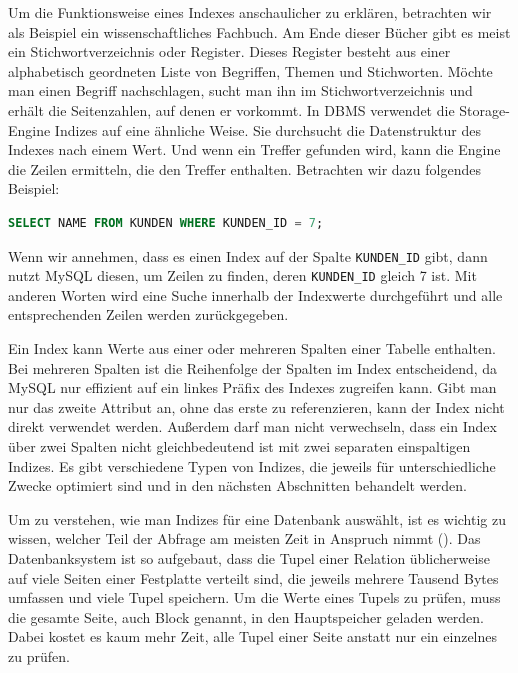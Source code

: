 Um die Funktionsweise eines Indexes anschaulicher zu erklären, betrachten wir als Beispiel ein wissenschaftliches Fachbuch.
Am Ende dieser Bücher gibt es meist ein Stichwortverzeichnis oder Register.
Dieses Register besteht aus einer alphabetisch geordneten Liste von Begriffen, Themen und Stichworten.
Möchte man einen Begriff nachschlagen, sucht man ihn im Stichwortverzeichnis und erhält die Seitenzahlen, auf denen er vorkommt.
In DBMS verwendet die Storage-Engine Indizes auf eine ähnliche Weise.
Sie durchsucht die Datenstruktur des Indexes nach einem Wert.
Und wenn ein Treffer gefunden wird, kann die Engine die Zeilen ermitteln, die den Treffer enthalten.
Betrachten wir dazu folgendes Beispiel:

\begin{lstlisting}[language=SQL]
SELECT NAME FROM KUNDEN WHERE KUNDEN_ID = 7;
\end{lstlisting}

Wenn wir annehmen, dass es einen Index auf der Spalte \texttt{KUNDEN\_ID} gibt, dann nutzt MySQL diesen, um Zeilen zu finden, deren \texttt{KUNDEN\_ID} gleich 7 ist.
Mit anderen Worten wird eine Suche innerhalb der Indexwerte durchgeführt und alle entsprechenden Zeilen werden zurückgegeben.

Ein Index kann Werte aus einer oder mehreren Spalten einer Tabelle enthalten.
Bei mehreren Spalten ist die Reihenfolge der Spalten im Index entscheidend, da MySQL nur effizient auf ein linkes Präfix des Indexes zugreifen kann.
Gibt man nur das zweite Attribut an, ohne das erste zu referenzieren, kann der Index nicht direkt verwendet werden.
Außerdem darf man nicht verwechseln, dass ein Index über zwei Spalten nicht gleichbedeutend ist mit zwei separaten einspaltigen Indizes.
Es gibt verschiedene Typen von Indizes, die jeweils für unterschiedliche Zwecke optimiert sind und in den nächsten Abschnitten behandelt werden.

Um zu verstehen, wie man Indizes für eine Datenbank auswählt, ist es wichtig zu wissen, welcher Teil der Abfrage am meisten Zeit in Anspruch nimmt (\cite[pp. 350--353]{garcia2008database}).
Das Datenbanksystem ist so aufgebaut, dass die Tupel einer Relation üblicherweise auf viele Seiten einer Festplatte verteilt sind, die jeweils mehrere Tausend Bytes umfassen und viele Tupel speichern.
Um die Werte eines Tupels zu prüfen, muss die gesamte Seite, auch Block genannt, in den Hauptspeicher geladen werden.
Dabei kostet es kaum mehr Zeit, alle Tupel einer Seite anstatt nur ein einzelnes zu prüfen.

